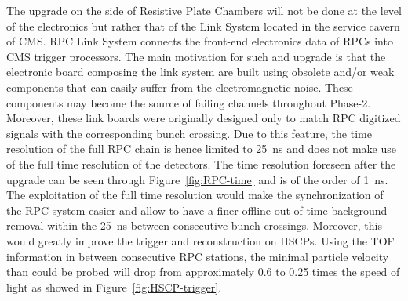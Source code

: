 	The upgrade on the side of Resistive Plate Chambers will not be done at the level of the electronics but rather that of the Link System located in the service cavern of CMS. RPC Link System connects the front-end electronics data of RPCs into CMS trigger processors. The main motivation for such and upgrade is that the electronic board composing the link system are built using obsolete and/or weak components that can easily suffer from the electromagnetic noise. These components may become the source of failing channels throughout Phase-2. Moreover, these link boards were originally designed only to match RPC digitized signals with the corresponding bunch crossing. Due to this feature, the time resolution of the full RPC chain is hence limited to \SI{25}{ns} and does not make use of the full time resolution of the detectors. The time resolution foreseen after the upgrade can be seen through Figure~\ref{fig:RPC-time} and is of the order of \SI{1}{ns}. The exploitation of the full time resolution would make the synchronization of the RPC system easier and allow to have a finer offline out-of-time background removal within the \SI{25}{ns} between consecutive bunch crossings. Moreover, this would greatly improve the trigger and reconstruction on HSCPs. Using the TOF information in between consecutive RPC stations, the minimal particle velocity than could be probed will drop from approximately 0.6 to 0.25 times the speed of light as showed in Figure~\ref{fig:HSCP-trigger}.
	
\endgroup
	
